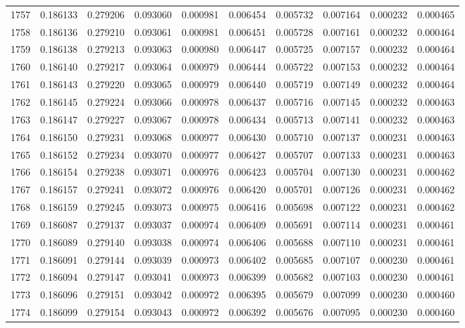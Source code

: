 \begin{tabular}{lrrrrrrrrr}
1757 & 0.186133 & 0.279206 & 0.093060 & 0.000981 & 0.006454 & 0.005732 & 0.007164 & 0.000232 & 0.000465 \\
1758 & 0.186136 & 0.279210 & 0.093061 & 0.000981 & 0.006451 & 0.005728 & 0.007161 & 0.000232 & 0.000464 \\
1759 & 0.186138 & 0.279213 & 0.093063 & 0.000980 & 0.006447 & 0.005725 & 0.007157 & 0.000232 & 0.000464 \\
1760 & 0.186140 & 0.279217 & 0.093064 & 0.000979 & 0.006444 & 0.005722 & 0.007153 & 0.000232 & 0.000464 \\
1761 & 0.186143 & 0.279220 & 0.093065 & 0.000979 & 0.006440 & 0.005719 & 0.007149 & 0.000232 & 0.000464 \\
1762 & 0.186145 & 0.279224 & 0.093066 & 0.000978 & 0.006437 & 0.005716 & 0.007145 & 0.000232 & 0.000463 \\
1763 & 0.186147 & 0.279227 & 0.093067 & 0.000978 & 0.006434 & 0.005713 & 0.007141 & 0.000232 & 0.000463 \\
1764 & 0.186150 & 0.279231 & 0.093068 & 0.000977 & 0.006430 & 0.005710 & 0.007137 & 0.000231 & 0.000463 \\
1765 & 0.186152 & 0.279234 & 0.093070 & 0.000977 & 0.006427 & 0.005707 & 0.007133 & 0.000231 & 0.000463 \\
1766 & 0.186154 & 0.279238 & 0.093071 & 0.000976 & 0.006423 & 0.005704 & 0.007130 & 0.000231 & 0.000462 \\
1767 & 0.186157 & 0.279241 & 0.093072 & 0.000976 & 0.006420 & 0.005701 & 0.007126 & 0.000231 & 0.000462 \\
1768 & 0.186159 & 0.279245 & 0.093073 & 0.000975 & 0.006416 & 0.005698 & 0.007122 & 0.000231 & 0.000462 \\
1769 & 0.186087 & 0.279137 & 0.093037 & 0.000974 & 0.006409 & 0.005691 & 0.007114 & 0.000231 & 0.000461 \\
1770 & 0.186089 & 0.279140 & 0.093038 & 0.000974 & 0.006406 & 0.005688 & 0.007110 & 0.000231 & 0.000461 \\
1771 & 0.186091 & 0.279144 & 0.093039 & 0.000973 & 0.006402 & 0.005685 & 0.007107 & 0.000230 & 0.000461 \\
1772 & 0.186094 & 0.279147 & 0.093041 & 0.000973 & 0.006399 & 0.005682 & 0.007103 & 0.000230 & 0.000461 \\
1773 & 0.186096 & 0.279151 & 0.093042 & 0.000972 & 0.006395 & 0.005679 & 0.007099 & 0.000230 & 0.000460 \\
1774 & 0.186099 & 0.279154 & 0.093043 & 0.000972 & 0.006392 & 0.005676 & 0.007095 & 0.000230 & 0.000460 \\

\end{tabular}
